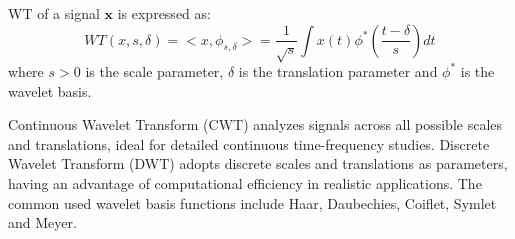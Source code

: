 \documentclass[final,12pt]{elsarticle}
\begin{document}
WT of a signal $\textbf{x}$ is expressed as: 
$$WT(x, s, \delta) = <x, \phi_{s, \delta}> = 
\frac{1}{\sqrt{s}} \int x(t) \phi^{\ast} (\frac{t-\delta}{s}) dt$$ 
where $s>0$ is the scale parameter, $\delta$ is the translation parameter 
and $\phi^{\ast}$ is the wavelet basis.  %

Continuous Wavelet Transform (CWT) analyzes signals 
across all possible scales and translations, 
ideal for detailed continuous time-frequency studies.  %
Discrete Wavelet Transform (DWT) adopts discrete scales and translations as parameters, 
having an advantage of computational efficiency in realistic applications.  %
The common used wavelet basis functions 
include Haar, Daubechies, Coiflet, Symlet and Meyer.  %


\begin{table}[h]  %
\label{tab-1}

  \caption{\textbf{Notations}}
  \small
  \centering


\end{table}
\end{document}

